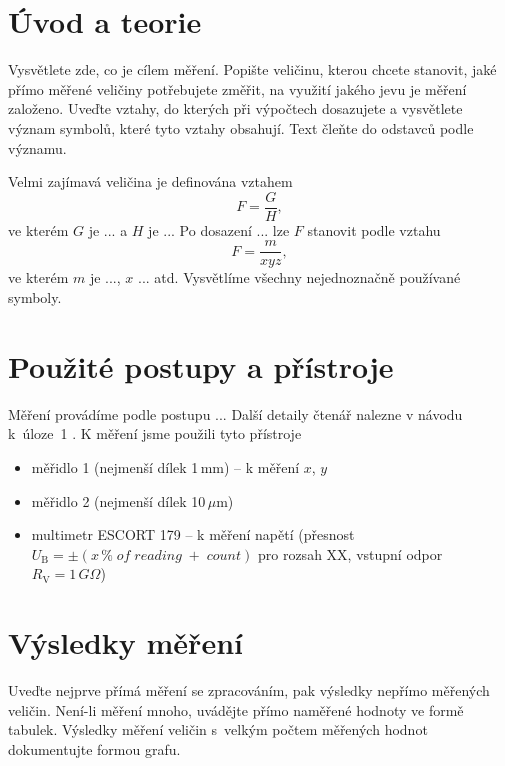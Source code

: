 \documentclass[a4paper,11pt]{article}
\begin{document}

\section{Úvod a teorie}
Vysvětlete zde, co je cílem měření. Popište veličinu, kterou chcete stanovit, jaké přímo měřené veličiny potřebujete změřit, na využití jakého jevu je měření založeno. Uveďte vztahy, do kterých při výpočtech dosazujete a vysvětlete význam symbolů, které tyto vztahy obsahují. Text čleňte do odstavců podle významu.

Velmi zajímavá veličina je definována vztahem
$$F = \frac{G}{H},$$
ve kterém $G$ je ... a $H$ je ... Po dosazení ... lze $F$ stanovit podle vztahu
\begin{equation}
 F = \frac{m}{x y z},\label{eq:F}   
\end{equation}
ve kterém $m$ je ..., $x$ ... atd. Vysvětlíme všechny nejednoznačně používané symboly.
 \section{Použité postupy a přístroje}

Měření provádíme podle postupu ... Další detaily čtenář nalezne v návodu k~úloze~1 \cite{navody}. K měření jsme použili tyto přístroje
\begin{itemize}
    \item měřidlo 1 (nejmenší dílek 1\,mm) -- k měření $x$, $y$
    \item měřidlo 2 (nejmenší dílek 10\,$\mu$m)
    \item multimetr ESCORT 179 -- k měření napětí (přesnost $U_\mathrm{B} = \pm (x\,\%\;of\;reading\;+\;count)$ pro rozsah XX, vstupní odpor $R_\mathrm{V} = 1\,G\Omega$)
\end{itemize}

\section{Výsledky měření}
Uveďte nejprve přímá měření se zpracováním, pak výsledky nepřímo měřených veličin. Není-li měření mnoho, uvádějte přímo naměřené hodnoty ve formě tabulek. Výsledky měření veličin s~velkým počtem měřených hodnot dokumentujte formou grafu. 
\end{document}
